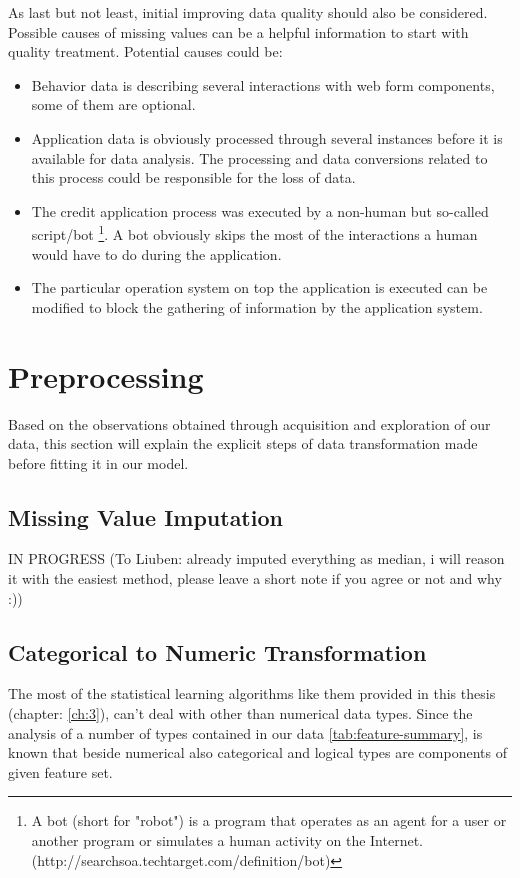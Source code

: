As last but not least, initial improving data quality should also be considered. Possible causes of missing values can be a helpful information to start with quality treatment. 
Potential causes could be:
    \begin{itemize}
    
        \item Behavior data is describing several interactions with web form components, some of them are optional.
        
        \item Application data is obviously processed through several instances before it is available for data analysis. The processing and data conversions related to this process could be responsible for the loss of data.
        
        \item The credit application process was executed by a non-human but so-called script/bot \footnote{A bot (short for "robot") is a program that operates as an agent for a user or another program or simulates a human activity on the Internet. (http://searchsoa.techtarget.com/definition/bot)}. A bot obviously skips the most of the interactions a human would have to do during the application. 
    
        \item The particular operation system on top the application is executed can be modified to block the gathering of information by the application system.
    \end{itemize}


\section{Preprocessing}\label{Ch:2:Preprocessing}
Based on the observations obtained through acquisition and exploration of our data, this section will explain the explicit steps of data transformation made before fitting it in our model.

\subsection{Missing Value Imputation}\label{Ch:2:MVI} 
  IN PROGRESS (To Liuben: already imputed everything as median, i will reason it with the easiest method, please leave a short note if you agree or not and why :))
 
\subsection{Categorical to Numeric Transformation}
\label{Ch:2:CTNT}
The most of the statistical learning algorithms like them provided in this thesis (chapter: \ref{ch:3}), can't deal with other than numerical data types. Since the analysis of a number of types contained in our data \ref{tab:feature-summary}, is known that beside numerical also categorical and logical types are components of given feature set. 

